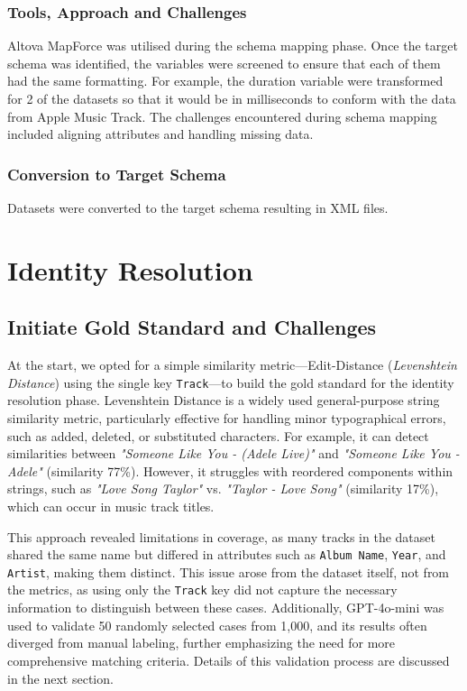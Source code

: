 \documentclass[runningheads]{llncs}
\begin{document}
\subsubsection{Tools, Approach and Challenges}
Altova MapForce was utilised during the schema mapping phase. Once the target schema was identified, the variables were screened to ensure that each of them had the same formatting. For example, the duration variable were transformed for 2 of the datasets so that it would be in milliseconds to conform with the data from Apple Music Track. The challenges encountered during schema mapping included aligning attributes and handling missing data.

\subsubsection{Conversion to Target Schema}
Datasets were converted to the target schema resulting in XML files.

\section{Identity Resolution}
\subsection{Initiate Gold Standard and Challenges}

At the start, we opted for a simple similarity metric---Edit-Distance (\textit{Levenshtein Distance}) using the single key \texttt{Track}---to build the gold standard for the identity resolution phase. Levenshtein Distance is a widely used general-purpose string similarity metric, particularly effective for handling minor typographical errors, such as added, deleted, or substituted characters. For example, it can detect similarities between \textit{"Someone Like You - (Adele Live)"} and \textit{"Someone Like You - Adele"} (similarity 77\%). However, it struggles with reordered components within strings, such as \textit{"Love Song Taylor"} vs. \textit{"Taylor - Love Song"} (similarity 17\%), which can occur in music track titles.

This approach revealed limitations in coverage, as many tracks in the dataset shared the same name but differed in attributes such as \texttt{Album Name}, \texttt{Year}, and \texttt{Artist}, making them distinct. This issue arose from the dataset itself, not from the metrics, as using only the \texttt{Track} key did not capture the necessary information to distinguish between these cases. Additionally, GPT-4o-mini was used to validate 50 randomly selected cases from 1,000, and its results often diverged from manual labeling, further emphasizing the need for more comprehensive matching criteria. Details of this validation process are discussed in the next section.
\end{document}
